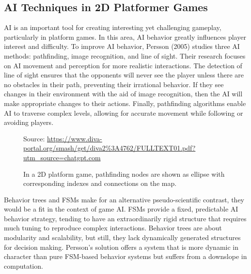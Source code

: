 \documentclass[12pt,oneside,openright,a4paper]{cpe-english-project}
\begin{document}
\subsection{AI Techniques in 2D Platformer Games}
AI is an important tool for creating interesting yet challenging gameplay, particularly in platform games. In this area, AI behavior greatly influences player interest and difficulty. To improve AI behavior, Persson (2005) studies three AI methods: pathfinding, image recognition, and line of sight. Their research focuses on AI movement and perception for more realistic interactions. The detection of line of sight ensures that the opponents will never see the player unless there are no obstacles in their path, preventing their irrational behavior. If they see changes in their environment with the aid of image recognition, then the AI will make appropriate changes to their actions. Finally, pathfinding algorithms enable AI to traverse complex levels, allowing for accurate movement while following or avoiding players.\par
\begin{figure}[!h]
\centering
{}
\caption{In a 2D platform game, pathfinding nodes are shown as ellipse with corresponding indexes and connections on the map.}\label{fig:AITechniq}
Source:
\href{https://www.diva-portal.org/smash/get/diva2\%3A4762/FULLTEXT01.pdf?utm\_source=chatgpt.com}{https://www.diva-portal.org/smash/get/diva2\%3A4762/FULLTEXT01.pdf?utm\_source=chatgpt.com}
\end{figure}
Behavior trees and FSMs make for an alternative pseudo-scientific contrast, they would be a fit in the context of game AI. FSMs provide a fixed, predictable AI behavior strategy, tending to have an extraordinarily rigid structure that requires much tuning to reproduce complex interactions. Behavior trees are about modularity and scalability, but still, they lack dynamically generated structures for decision making. Persson's solution offers a system that is more dynamic in character than pure FSM-based behavior systems but suffers from a downslope in computation.\par
\newpage
\end{document}
